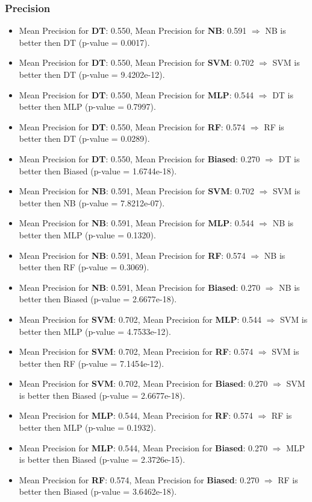 \documentclass{article}
\begin{document}
\subsubsection{Precision}
\begin{itemize}
    \item Mean Precision for \textbf{DT}: 0.550, Mean Precision for \textbf{NB}: 0.591 $\Rightarrow$ NB is better then DT (p-value = 0.0017).
    \item Mean Precision for \textbf{DT}: 0.550, Mean Precision for \textbf{SVM}: 0.702 $\Rightarrow$ SVM is better then DT (p-value = 9.4202e-12).
    \item Mean Precision for \textbf{DT}: 0.550, Mean Precision for \textbf{MLP}: 0.544 $\Rightarrow$ DT is better then MLP (p-value = 0.7997).
    \item Mean Precision for \textbf{DT}: 0.550, Mean Precision for \textbf{RF}: 0.574 $\Rightarrow$ RF is better then DT (p-value = 0.0289).
    \item Mean Precision for \textbf{DT}: 0.550, Mean Precision for \textbf{Biased}: 0.270 $\Rightarrow$ DT is better then Biased (p-value = 1.6744e-18).
    \item Mean Precision for \textbf{NB}: 0.591, Mean Precision for \textbf{SVM}: 0.702 $\Rightarrow$ SVM is better then NB (p-value = 7.8212e-07).
    \item Mean Precision for \textbf{NB}: 0.591, Mean Precision for \textbf{MLP}: 0.544 $\Rightarrow$ NB is better then MLP (p-value = 0.1320).
    \item Mean Precision for \textbf{NB}: 0.591, Mean Precision for \textbf{RF}: 0.574 $\Rightarrow$ NB is better then RF (p-value = 0.3069).
    \item Mean Precision for \textbf{NB}: 0.591, Mean Precision for \textbf{Biased}: 0.270 $\Rightarrow$ NB is better then Biased (p-value = 2.6677e-18).
    \item Mean Precision for \textbf{SVM}: 0.702, Mean Precision for \textbf{MLP}: 0.544 $\Rightarrow$ SVM is better then MLP (p-value = 4.7533e-12).
    \item Mean Precision for \textbf{SVM}: 0.702, Mean Precision for \textbf{RF}: 0.574 $\Rightarrow$ SVM is better then RF (p-value = 7.1454e-12).
    \item Mean Precision for \textbf{SVM}: 0.702, Mean Precision for \textbf{Biased}: 0.270 $\Rightarrow$ SVM is better then Biased (p-value = 2.6677e-18).
    \item Mean Precision for \textbf{MLP}: 0.544, Mean Precision for \textbf{RF}: 0.574 $\Rightarrow$ RF is better then MLP (p-value = 0.1932).
    \item Mean Precision for \textbf{MLP}: 0.544, Mean Precision for \textbf{Biased}: 0.270 $\Rightarrow$ MLP is better then Biased (p-value = 2.3726e-15).
    \item Mean Precision for \textbf{RF}: 0.574, Mean Precision for \textbf{Biased}: 0.270 $\Rightarrow$ RF is better then Biased (p-value = 3.6462e-18).
\end{itemize}
\end{document}

